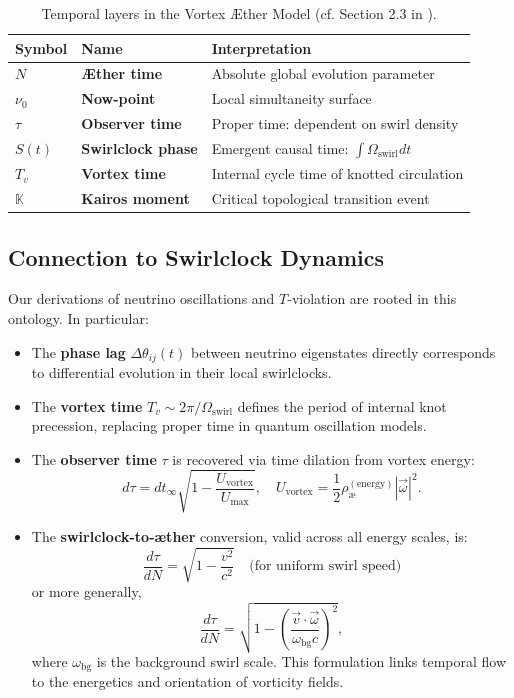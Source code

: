 \begin{table}[H]
\centering
\renewcommand{\arraystretch}{1.3}
\begin{tabular}{|l|l|l|}
\hline
\textbf{Symbol} & \textbf{Name} & \textbf{Interpretation} \\
\hline
$N$ & \textbf{Æther time} & Absolute global evolution parameter \\
$\nu_0$ & \textbf{Now-point} & Local simultaneity surface \\
$\tau$ & \textbf{Observer time} & Proper time: dependent on swirl density \\
$S(t)$ & \textbf{Swirlclock phase} & Emergent causal time: $\int \Omega_\text{swirl} dt$ \\
$T_v$ & \textbf{Vortex time} & Internal cycle time of knotted circulation \\
$\mathbb{K}$ & \textbf{Kairos moment} & Critical topological transition event \\
\hline
\end{tabular}
\caption{Temporal layers in the Vortex Æther Model (cf. Section 2.3 in \cite{Iskandarani2025VAM}).}
\end{table}

\subsection*{Connection to Swirlclock Dynamics}

Our derivations of neutrino oscillations and $T$-violation are rooted in this ontology. In particular:

\begin{itemize}
    \item The \textbf{phase lag} $\Delta \theta_{ij}(t)$ between neutrino eigenstates directly corresponds to differential evolution in their local swirlclocks.
    \item The \textbf{vortex time} $T_v \sim 2\pi / \Omega_{\text{swirl}}$ defines the period of internal knot precession, replacing proper time in quantum oscillation models.
    \item The \textbf{observer time} $\tau$ is recovered via time dilation from vortex energy:
    \[
    d\tau = dt_\infty \sqrt{1 - \frac{U_{\text{vortex}}}{U_{\text{max}}}}, \quad
    U_{\text{vortex}} = \frac{1}{2} \rho_\text{\ae}^{(\text{energy})} |\vec{\omega}|^2.
    \]
    \item The \textbf{swirlclock-to-æther} conversion, valid across all energy scales, is:
    \[
    \frac{d\tau}{dN} = \sqrt{1 - \frac{v^2}{c^2}} \quad \text{(for uniform swirl speed)}
    \]
    or more generally,
    \[
    \frac{d\tau}{dN} = \sqrt{1 - \left( \frac{\vec{v} \cdot \vec{\omega}}{\omega_{\text{bg}} c} \right)^2},
    \]
    where $\omega_{\text{bg}}$ is the background swirl scale. This formulation links temporal flow to the energetics and orientation of vorticity fields.
\end{itemize}

